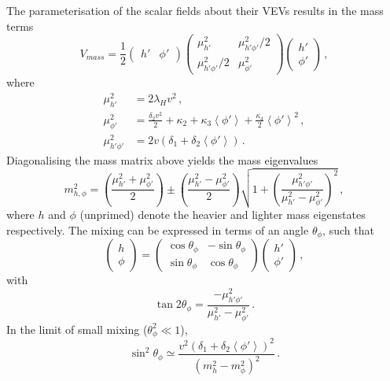 \documentclass[aps, prd, reprint, nofootinbib, amsmath, amssymb, floatfix]{revtex4-2}
\newcommand{\vev}[1]{\left< #1 \right>}      %
\begin{document}
The parameterisation of the scalar fields about their VEVs results in the mass terms
%
\begin{equation}
    V_{mass} = \frac{1}{2}\begin{pmatrix}h' & \phi'\end{pmatrix}
    \begin{pmatrix}\mu_{h'}^2 & \mu_{h' \phi'}^2/2 \\ \mu_{h' \phi'}^2/2 & \mu_{\phi'}^2\end{pmatrix}
    \begin{pmatrix}h' \\ \phi'\end{pmatrix} \,,
\end{equation}
%
where
%
\begin{align}
    \mu_{h'}^2 & = 2\lambda_H v^2 \,, \\
    \mu_{\phi'}^2 & = \frac{\delta_2 v^2}{2} + \kappa_2 + \kappa_3 \vev{\phi'} + \frac{\kappa_4}{2} \vev{\phi'}^2 \,, \\
    \mu_{h' \phi'}^2 & = 2v(\delta_1 +\delta_2 \vev{\phi'}) \,.
\end{align}
%
Diagonalising the mass matrix above yields the mass eigenvalues
%
\begin{equation}
    m_{h,\phi}^2 = \left(\frac{\mu_{h'}^2 + \mu_{\phi'}^2}{2}\right) \pm \left(\frac{\mu_{h'}^2 - \mu_{\phi'}^2}{2}\right)\sqrt{1 + \left(\frac{\mu_{h' \phi'}^2}{\mu_{h'}^2 - \mu_{\phi'}^2}\right)^2} \,,
\end{equation}
%
where $h$ and $\phi$ (unprimed) denote the heavier and lighter mass eigenstates respectively. The mixing can be expressed in terms of an angle $\theta_\phi$, such that
%
\begin{equation}
    \begin{pmatrix}h \\ \phi\end{pmatrix} =
    \begin{pmatrix}\cos\theta_\phi & -\sin\theta_\phi \\ \sin\theta_\phi & \cos\theta_\phi\end{pmatrix}
    \begin{pmatrix}h' \\ \phi'\end{pmatrix} \,,
\end{equation}
%
with
%
\begin{equation}\label{eq:tanthetaS}
    \tan 2\theta_\phi = \frac{-\mu_{h' \phi'}^2}{\mu_{h'}^2 - \mu_{\phi'}^2} \,.
\end{equation}
%
In the limit of small mixing ($\theta_\phi^2 \ll 1$),
%
\begin{equation}
    \sin^2\theta_\phi \simeq \frac{v^2 (\delta_1+\delta_2\vev{\phi'})^2}{(m_h^2-m_\phi^2)^2} \,.
\end{equation}
\end{document}
